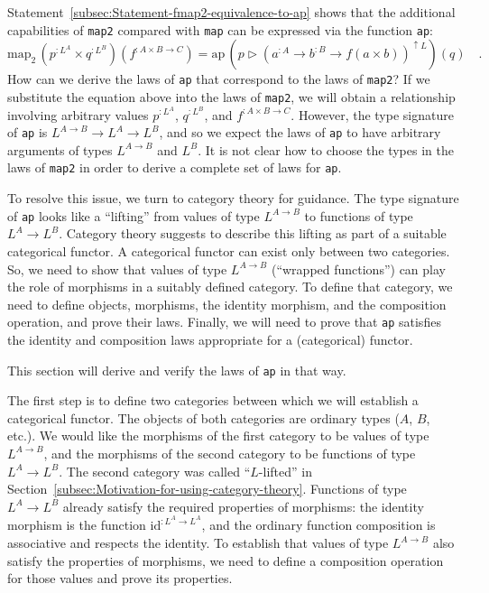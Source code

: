 Statement~\ref{subsec:Statement-fmap2-equivalence-to-ap} shows that
the additional capabilities of \lstinline!map2! compared with \lstinline!map!
can be expressed via the function \lstinline!ap!:
\[
\text{map}_{2}\,(p^{:L^{A}}\times q^{:L^{B}})(f^{:A\times B\rightarrow C})=\text{ap}\,(p\triangleright(a^{:A}\rightarrow b^{:B}\rightarrow f(a\times b))^{\uparrow L})(q)\quad.
\]
How can we derive the laws of \lstinline!ap! that correspond to the
laws of \lstinline!map2!? If we substitute the equation above into
the laws of \lstinline!map2!, we will obtain a relationship involving
arbitrary values $p^{:L^{A}}$, $q^{:L^{B}}$, and $f^{:A\times B\rightarrow C}$.
However, the type signature of \lstinline!ap! is $L^{A\rightarrow B}\rightarrow L^{A}\rightarrow L^{B}$,
and so we expect the laws of \lstinline!ap! to have arbitrary arguments
of types $L^{A\rightarrow B}$ and $L^{B}$. It is not clear how to
choose the types in the laws of \lstinline!map2! in order to derive
a complete set of laws for \lstinline!ap!.

To resolve this issue, we turn to category theory for guidance. The
type signature of \lstinline!ap! looks like a \textsf{``}lifting\textsf{''} from
values of type $L^{A\rightarrow B}$ to functions of type $L^{A}\rightarrow L^{B}$.
Category theory suggests to describe this lifting as part of a suitable
categorical functor.
A categorical functor can exist only between two categories. So, we
need to show that values of type $L^{A\rightarrow B}$ (\textsf{``}wrapped
functions\textsf{''}) can play the role of morphisms in a suitably defined
category. To define that category, we need to define objects, morphisms,
the identity morphism, and the composition operation, and prove their
laws. Finally, we will need to prove that \lstinline!ap! satisfies
the identity and composition laws appropriate for a (categorical)
functor.

This section will derive and verify the laws of \lstinline!ap! in
that way.

The first step is to define two categories between which we will establish
a categorical functor. The objects of both categories are ordinary
types ($A$, $B$, etc.). We would like the morphisms of the first
category to be values of type $L^{A\rightarrow B}$, and the morphisms
of the second category to be functions of type $L^{A}\rightarrow L^{B}$.
The second category was called \textsf{``}$L$-lifted\textsf{''} in Section~\ref{subsec:Motivation-for-using-category-theory}.
Functions of type $L^{A}\rightarrow L^{B}$ already satisfy the required
properties of morphisms: the identity morphism is the function $\text{id}^{:L^{A}\rightarrow L^{A}}$,
and the ordinary function composition is associative and respects
the identity. To establish that values of type $L^{A\rightarrow B}$
also satisfy the properties of morphisms, we need to define a composition
operation for those values and prove its properties.

